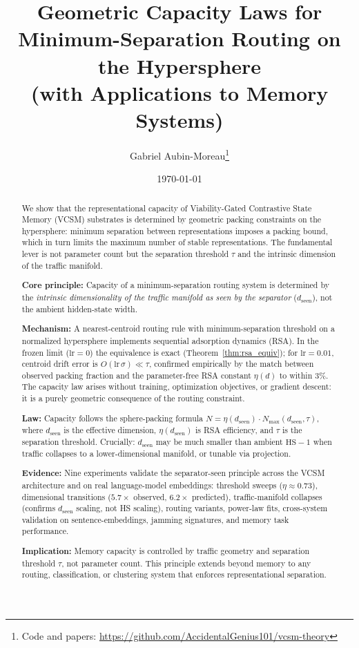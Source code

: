 \documentclass[11pt]{article}
\title{Geometric Capacity Laws for Minimum-Separation Routing on the Hypersphere\\(with Applications to Memory Systems)}
\author{Gabriel Aubin-Moreau\thanks{Code and papers: \url{https://github.com/AccidentalGenius101/vcsm-theory}}}
\date{\today}
\begin{document}
\maketitle

\begin{abstract}
\noindent We show that the representational capacity of Viability-Gated Contrastive State Memory (VCSM) substrates is determined by geometric packing constraints on the hypersphere: minimum separation between representations imposes a packing bound, which in turn limits the maximum number of stable representations. The fundamental lever is not parameter count but the separation threshold $\tau$ and the intrinsic dimension of the traffic manifold.

\noindent\textbf{Core principle:} Capacity of a minimum-separation routing system is determined by the \emph{intrinsic dimensionality of the traffic manifold as seen by the separator} ($d_{\text{seen}}$), not the ambient hidden-state width.

\noindent\textbf{Mechanism:} A nearest-centroid routing rule with minimum-separation threshold on a normalized hypersphere implements sequential adsorption dynamics (RSA). In the frozen limit ($\mathrm{lr} = 0$) the equivalence is exact (Theorem~\ref{thm:rsa_equiv}); for $\mathrm{lr} = 0.01$, centroid drift error is $O(\mathrm{lr}\,\sigma) \ll \tau$, confirmed empirically by the match between observed packing fraction and the parameter-free RSA constant $\eta(d)$ to within 3\%. The capacity law arises without training, optimization objectives, or gradient descent: it is a purely geometric consequence of the routing constraint.

\noindent\textbf{Law:} Capacity follows the sphere-packing formula $N = \eta(d_{\text{seen}}) \cdot N_{\max}(d_{\text{seen}}, \tau)$, where $d_{\text{seen}}$ is the effective dimension, $\eta(d_{\text{seen}})$ is RSA efficiency, and $\tau$ is the separation threshold. Crucially: $d_{\text{seen}}$ may be much smaller than ambient $\mathrm{HS}-1$ when traffic collapses to a lower-dimensional manifold, or tunable via projection.

\noindent\textbf{Evidence:} Nine experiments validate the separator-seen principle across the VCSM architecture and on real language-model embeddings: threshold sweeps ($\eta \approx 0.73$), dimensional transitions ($5.7\times$ observed, $6.2\times$ predicted), traffic-manifold collapses (confirms $d_{\text{seen}}$ scaling, not HS scaling), routing variants, power-law fits, cross-system validation on sentence-embeddings, jamming signatures, and memory task performance.

\noindent\textbf{Implication:} Memory capacity is controlled by traffic geometry and separation threshold $\tau$, not parameter count. This principle extends beyond memory to any routing, classification, or clustering system that enforces representational separation.
\end{abstract}
\end{document}

